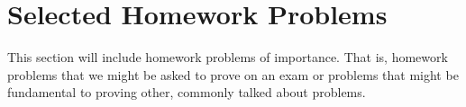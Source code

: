 \section{Selected Homework Problems}
This section will include homework problems of importance. That is, homework problems that we might be asked to prove on an exam or problems that might
be fundamental to proving other, commonly talked about problems.